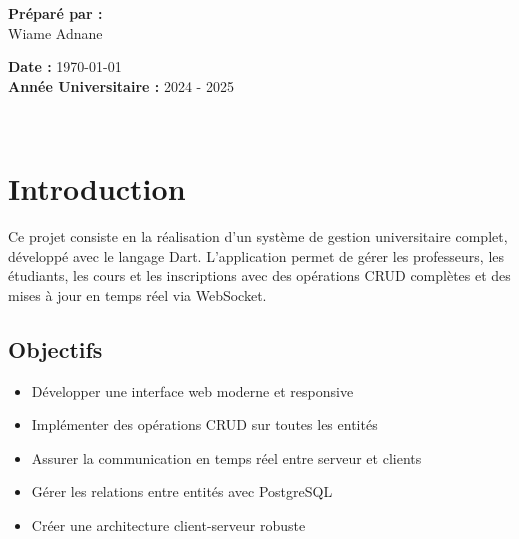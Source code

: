 \documentclass{article}
\begin{document}
\begin{titlepage}
\begin{minipage}[t]{0.45\textwidth}
    \end{minipage}
    \hfill
    \begin{minipage}[t]{0.25\textwidth}
        \large \textbf{Préparé par :} \\[0.3cm]
        Wiame Adnane \\[0.1cm]
    \end{minipage}

    \vspace{2cm}
    \begin{center}
        \large \textbf{Date :} \today \\[0.2cm]
        \large \textbf{Année Universitaire :} 2024 - 2025
    \end{center}

\end{titlepage}

\pagestyle{fancy}
\fancyhf{}
\fancyhead[R]{\nouppercase{\rightmark}}
\fancyfoot[C]{\thepage}
\renewcommand{\footrulewidth}{1pt}


\clearpage
\thispagestyle{Table of content}
\renewcommand{\contentsname}{\normalsize Table des matières} \\
\tableofcontents

\clearpage
\section{Introduction}

Ce projet consiste en la réalisation d'un système de gestion universitaire complet, développé avec le langage Dart. L'application permet de gérer les professeurs, les étudiants, les cours et les inscriptions avec des opérations CRUD complètes et des mises à jour en temps réel via WebSocket.

\subsection{Objectifs}

\begin{itemize}
    \item Développer une interface web moderne et responsive
    \item Implémenter des opérations CRUD sur toutes les entités
    \item Assurer la communication en temps réel entre serveur et clients
    \item Gérer les relations entre entités avec PostgreSQL
    \item Créer une architecture client-serveur robuste
\end{itemize}
\end{document}
